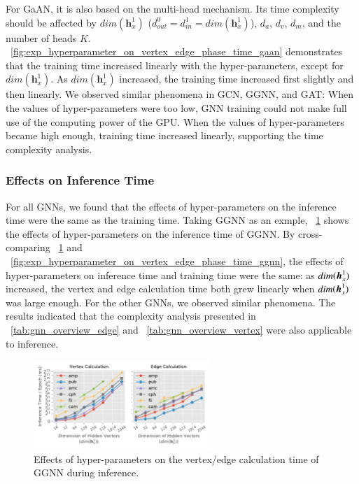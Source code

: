 For GaAN, it is also based on the multi-head mechanism.
%
Its time complexity should be affected by $dim(\boldsymbol{h}^1_x)$ ($d^0_{out} = d^1_{in} = dim(\boldsymbol{h}^1_x)$), $d_a$, $d_v$, $d_m$, and the number of heads $K$.
%
\figurename~\ref{fig:exp_hyperparameter_on_vertex_edge_phase_time_gaan} demonstrates that the training time increased linearly with the hyper-parameters, except for $dim(\boldsymbol{h}^1_x)$.
As $dim(\boldsymbol{h}^1_x)$ increased, the training time increased first slightly and then linearly.
We observed similar phenomena in GCN, GGNN, and GAT:
When the values of hyper-parameters were too low, GNN training could not make full use of the computing power of the GPU.
%
When the values of hyper-parameters became high enough, training time increased linearly, supporting the time complexity analysis.

\subsubsection{Effects on Inference Time}

For all GNNs, we found that the effects of hyper-parameters on the inference time were the same as the training time.
%
Taking GGNN as an exmple, \figurename~\ref{fig:exp_hyperparameter_on_inference_vertex_edge_phase_time_ggnn} shows the effects of hyper-parameters on the inference time of GGNN.
%
By cross-comparing \figurename~\ref{fig:exp_hyperparameter_on_inference_vertex_edge_phase_time_ggnn} and \figurename~\ref{fig:exp_hyperparameter_on_vertex_edge_phase_time_ggnn}, the effects of hyper-parameters on inference time and training time were the same: as $dim(\boldsymbol{h}^1_x)$ increased, the vertex and edge calculation time both grew linearly when $dim(\boldsymbol{h}^1_x)$ was large enough.
%
For the other GNNs, we observed similar phenomena.
%
The results indicated that the complexity analysis presented in \tablename~\ref{tab:gnn_overview_edge} and \tablename~\ref{tab:gnn_overview_vertex} were also applicable to inference.

\begin{figure}[H]
    \centering
    \includegraphics[width=0.6\textwidth]{figs/experiments/exp_hyperparameter_on_inference_vertex_edge_phase_time_ggnn.pdf}
    \caption{Effects of hyper-parameters on the vertex/edge calculation time of GGNN during inference.}
    \label{fig:exp_hyperparameter_on_inference_vertex_edge_phase_time_ggnn}
\end{figure}


